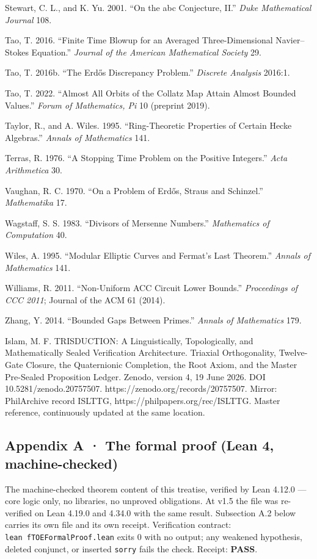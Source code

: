 \documentclass[10pt]{article}
\renewcommand{\_}{\origunderscore\allowbreak}
\begin{document}
Stewart, C. L., and K. Yu. 2001. ``On the abc Conjecture, II.''
\emph{Duke Mathematical Journal} 108.

Tao, T. 2016. ``Finite Time Blowup for an Averaged Three-Dimensional
Navier--Stokes Equation.'' \emph{Journal of the American Mathematical
Society} 29.

Tao, T. 2016b. ``The Erdős Discrepancy Problem.'' \emph{Discrete
Analysis} 2016:1.

Tao, T. 2022. ``Almost All Orbits of the Collatz Map Attain Almost
Bounded Values.'' \emph{Forum of Mathematics, Pi} 10 (preprint 2019).

Taylor, R., and A. Wiles. 1995. ``Ring-Theoretic Properties of Certain
Hecke Algebras.'' \emph{Annals of Mathematics} 141.

Terras, R. 1976. ``A Stopping Time Problem on the Positive Integers.''
\emph{Acta Arithmetica} 30.

Vaughan, R. C. 1970. ``On a Problem of Erdős, Straus and Schinzel.''
\emph{Mathematika} 17.

Wagstaff, S. S. 1983. ``Divisors of Mersenne Numbers.''
\emph{Mathematics of Computation} 40.

Wiles, A. 1995. ``Modular Elliptic Curves and Fermat's Last Theorem.''
\emph{Annals of Mathematics} 141.

Williams, R. 2011. ``Non-Uniform ACC Circuit Lower Bounds.''
\emph{Proceedings of CCC 2011}; Journal of the ACM 61 (2014).

Zhang, Y. 2014. ``Bounded Gaps Between Primes.'' \emph{Annals of
Mathematics} 179.

Islam, M. F. TRISDUCTION: A Linguistically, Topologically, and
Mathematically Sealed Verification Architecture. Triaxial Orthogonality,
Twelve-Gate Closure, the Quaternionic Completion, the Root Axiom, and
the Master Pre-Sealed Proposition Ledger. Zenodo, version 4, 19 June
2026. DOI 10.5281/zenodo.20757507. https://zenodo.org/records/20757507.
Mirror: PhilArchive record ISLTTG, https://philpapers.org/rec/ISLTTG.
Master reference, continuously updated at the same location.

\hypertarget{appendix-a-the-formal-proof-lean-4-machine-checked}{%
\subsection{Appendix A · The formal proof (Lean 4,
machine-checked)}\label{appendix-a-the-formal-proof-lean-4-machine-checked}}

The machine-checked theorem content of this treatise, verified by Lean
4.12.0 --- core logic only, no libraries, no unproved obligations. At
v1.5 the file was re-verified on Lean 4.19.0 and 4.34.0 with the same
result. Subsection A.2 below carries its own file and its own receipt.
Verification contract: \texttt{lean\ fTOE\_Formal\_Proof.lean} exits 0
with no output; any weakened hypothesis, deleted conjunct, or inserted
\texttt{sorry} fails the check. Receipt: \textbf{PASS}.
\end{document}
